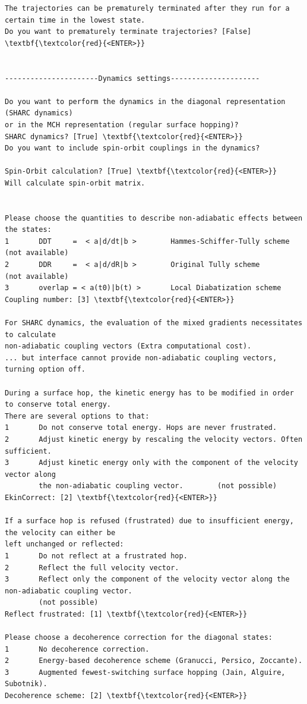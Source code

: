 \documentclass[a4paper,11pt,DIV=15,openany]{scrbook}
\begin{document}
\begin{oframed}
\begin{Verbatim}[commandchars=\\\{\}]
The trajectories can be prematurely terminated after they run for a certain time in the lowest state. 
Do you want to prematurely terminate trajectories? [False] \textbf{\textcolor{red}{<ENTER>}}


----------------------Dynamics settings---------------------

Do you want to perform the dynamics in the diagonal representation (SHARC dynamics) 
or in the MCH representation (regular surface hopping)?
SHARC dynamics? [True] \textbf{\textcolor{red}{<ENTER>}}
Do you want to include spin-orbit couplings in the dynamics?

Spin-Orbit calculation? [True] \textbf{\textcolor{red}{<ENTER>}}
Will calculate spin-orbit matrix.


Please choose the quantities to describe non-adiabatic effects between the states:
1       DDT     =  < a|d/dt|b >        Hammes-Schiffer-Tully scheme   (not available)
2       DDR     =  < a|d/dR|b >        Original Tully scheme          (not available)
3       overlap = < a(t0)|b(t) >       Local Diabatization scheme     
Coupling number: [3] \textbf{\textcolor{red}{<ENTER>}}

For SHARC dynamics, the evaluation of the mixed gradients necessitates to calculate 
non-adiabatic coupling vectors (Extra computational cost).
... but interface cannot provide non-adiabatic coupling vectors, turning option off.

During a surface hop, the kinetic energy has to be modified in order to conserve total energy. 
There are several options to that:
1       Do not conserve total energy. Hops are never frustrated.
2       Adjust kinetic energy by rescaling the velocity vectors. Often sufficient.
3       Adjust kinetic energy only with the component of the velocity vector along 
        the non-adiabatic coupling vector.        (not possible)
EkinCorrect: [2] \textbf{\textcolor{red}{<ENTER>}}

If a surface hop is refused (frustrated) due to insufficient energy, the velocity can either be 
left unchanged or reflected:
1       Do not reflect at a frustrated hop.
2       Reflect the full velocity vector.
3       Reflect only the component of the velocity vector along the non-adiabatic coupling vector.
        (not possible)
Reflect frustrated: [1] \textbf{\textcolor{red}{<ENTER>}}

Please choose a decoherence correction for the diagonal states:
1       No decoherence correction.
2       Energy-based decoherence scheme (Granucci, Persico, Zoccante).
3       Augmented fewest-switching surface hopping (Jain, Alguire, Subotnik).
Decoherence scheme: [2] \textbf{\textcolor{red}{<ENTER>}}


\end{Verbatim}
\end{oframed}
\end{document}
